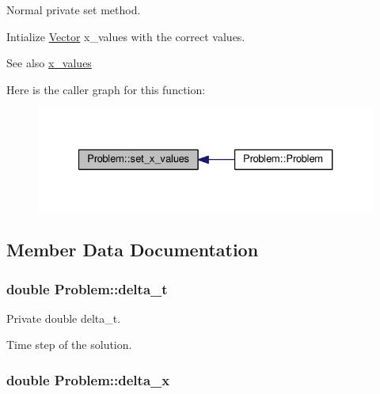 Normal private set method. 

Intialize \hyperlink{classVector}{Vector} x\+\_\+values with the correct values. \begin{DoxySeeAlso}{See also}
\hyperlink{classProblem_a2b451feb5a8d7f3e870e2b5e607f0b7c}{x\+\_\+values} 
\end{DoxySeeAlso}


Here is the caller graph for this function\+:
\nopagebreak
\begin{figure}[H]
\begin{center}
\leavevmode
\includegraphics[width=327pt]{classProblem_a05100ba1606694f73080238a5d7ed9a5_icgraph}
\end{center}
\end{figure}




\subsection{Member Data Documentation}
\subsubsection[{\texorpdfstring{delta\+\_\+t}{delta_t}}]{\setlength{\rightskip}{0pt plus 5cm}double Problem\+::delta\+\_\+t\hspace{0.3cm}{\ttfamily [private]}}\hypertarget{classProblem_adb04657b8f456da09cefbcd6328403fe}{}\label{classProblem_adb04657b8f456da09cefbcd6328403fe}


Private double delta\+\_\+t. 

Time step of the solution. 
\subsubsection[{\texorpdfstring{delta\+\_\+x}{delta_x}}]{\setlength{\rightskip}{0pt plus 5cm}double Problem\+::delta\+\_\+x\hspace{0.3cm}{\ttfamily [private]}}\hypertarget{classProblem_a6d6d5f0aeca78dc62a84f74ab3d609d9}{}\label{classProblem_a6d6d5f0aeca78dc62a84f74ab3d609d9}


